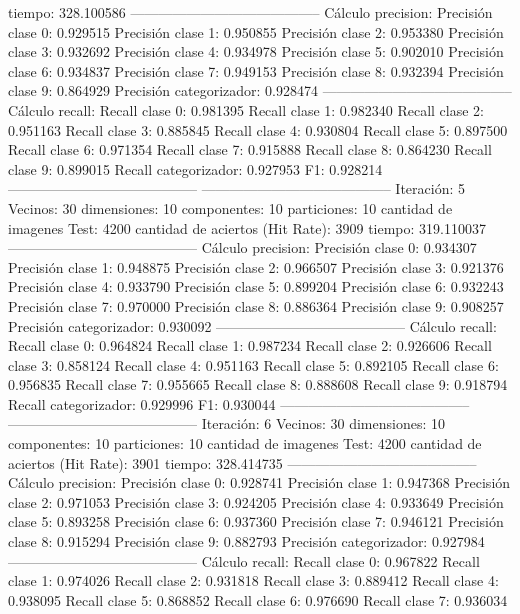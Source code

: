 tiempo: 328.100586
-----------------------------------------
Cálculo precision: 
Precisión clase 0: 0.929515
Precisión clase 1: 0.950855
Precisión clase 2: 0.953380
Precisión clase 3: 0.932692
Precisión clase 4: 0.934978
Precisión clase 5: 0.902010
Precisión clase 6: 0.934837
Precisión clase 7: 0.949153
Precisión clase 8: 0.932394
Precisión clase 9: 0.864929
Precisión categorizador: 0.928474
-----------------------------------------
Cálculo recall: 
Recall clase 0: 0.981395
Recall clase 1: 0.982340
Recall clase 2: 0.951163
Recall clase 3: 0.885845
Recall clase 4: 0.930804
Recall clase 5: 0.897500
Recall clase 6: 0.971354
Recall clase 7: 0.915888
Recall clase 8: 0.864230
Recall clase 9: 0.899015
Recall categorizador: 0.927953
F1: 0.928214
-----------------------------------------
-----------------------------------------
Iteración: 5
Vecinos: 30
dimensiones: 10
componentes: 10
particiones: 10
cantidad de imagenes Test: 4200
cantidad de aciertos (Hit Rate): 3909
tiempo: 319.110037
-----------------------------------------
Cálculo precision: 
Precisión clase 0: 0.934307
Precisión clase 1: 0.948875
Precisión clase 2: 0.966507
Precisión clase 3: 0.921376
Precisión clase 4: 0.933790
Precisión clase 5: 0.899204
Precisión clase 6: 0.932243
Precisión clase 7: 0.970000
Precisión clase 8: 0.886364
Precisión clase 9: 0.908257
Precisión categorizador: 0.930092
-----------------------------------------
Cálculo recall: 
Recall clase 0: 0.964824
Recall clase 1: 0.987234
Recall clase 2: 0.926606
Recall clase 3: 0.858124
Recall clase 4: 0.951163
Recall clase 5: 0.892105
Recall clase 6: 0.956835
Recall clase 7: 0.955665
Recall clase 8: 0.888608
Recall clase 9: 0.918794
Recall categorizador: 0.929996
F1: 0.930044
-----------------------------------------
-----------------------------------------
Iteración: 6
Vecinos: 30
dimensiones: 10
componentes: 10
particiones: 10
cantidad de imagenes Test: 4200
cantidad de aciertos (Hit Rate): 3901
tiempo: 328.414735
-----------------------------------------
Cálculo precision: 
Precisión clase 0: 0.928741
Precisión clase 1: 0.947368
Precisión clase 2: 0.971053
Precisión clase 3: 0.924205
Precisión clase 4: 0.933649
Precisión clase 5: 0.893258
Precisión clase 6: 0.937360
Precisión clase 7: 0.946121
Precisión clase 8: 0.915294
Precisión clase 9: 0.882793
Precisión categorizador: 0.927984
-----------------------------------------
Cálculo recall: 
Recall clase 0: 0.967822
Recall clase 1: 0.974026
Recall clase 2: 0.931818
Recall clase 3: 0.889412
Recall clase 4: 0.938095
Recall clase 5: 0.868852
Recall clase 6: 0.976690
Recall clase 7: 0.936034
